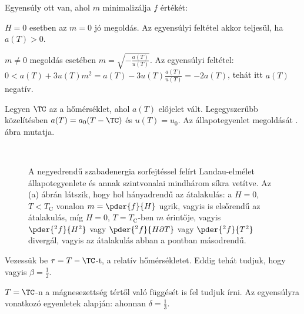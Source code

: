   Egyensúly ott van, ahol $m$ minimalizálja $f$ értékét:
  
  $H=0$ esetben az $m=0$ jó megoldás.
   Az egyensúlyi feltétel akkor teljesül, ha $a(T)>0$.
  
  $m\ne 0$ megoldás esetében $m=\sqrt{-\frac{a(T)}{u(T)}}$.
   Az egyensúlyi feltétel: $0<a(T)+3 u(T)m^2=a(T)-3u(T)\frac{a(T)}{u(T)}=-2a(T)$, tehát itt $a(T)$ negatív. 
  
  Legyen $\TC$ az a hőmérséklet, ahol $a(T)$ előjelet vált.
   Legegyszerűbb közelítésben $a(T)=a_0(T-\TC)$ és $u(T)=u_0$.
   Az állapotegyenlet megoldását . ábra mutatja.
  
  \begin{figure}[ht!]
   \centering
    \\
    \hspace{6pt}
    \hspace{6pt}
   \caption{A negyedrendű szabadenergia sorfejtéssel felírt Landau-elmélet  állapotegyenlete és annak szintvonalai mindhárom síkra vetítve.
   Az (a) ábrán látszik, hogy hol hányadrendű az átalakulás: a $H=0$, $T<T_\text{C}$ vonalon $m=\pder{f}{H}$ ugrik, vagyis is elsőrendű az átalakulás, míg $H=0$, $T=T_\text{C}$-ben $m$ érintője, vagyis $\pder{^2 f}{H^2}$ vagy $\pder{^2 f}{H\partial T}$ vagy $\pder{^2 f}{T^2}$ divergál, vagyis az átalakulás abban a pontban másodrendű.}\label{fig:B10-landau}
  \end{figure}
  
  Vezessük be $\tau=T-\TC$-t, a relatív hőmérsékletet.
  Eddig tehát tudjuk, hogy
  vagyis $\beta=\frac{1}{2}$.
  
  $T=\TC$-n a mágnesezettség tértől való függését is fel tudjuk írni.
   Az egyensúlyra vonatkozó egyenletek alapján:
  ahonnan $\delta=\frac{1}{3}$.
  
